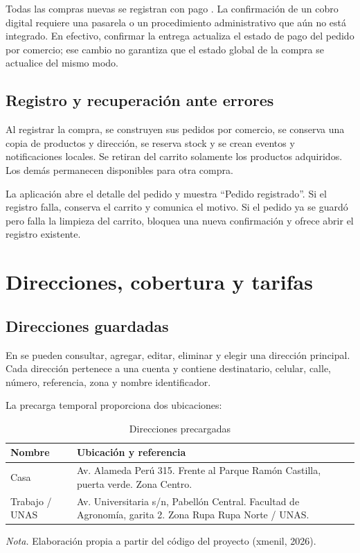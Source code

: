 \documentclass[12pt,letterpaper]{article}
\newcommand{\codigo}[1]{\texttt{\detokenize{#1}}}
\begin{document}
Todas las compras nuevas se registran con pago \codigo{pendiente}. La confirmación de un cobro digital requiere una pasarela o un procedimiento administrativo que aún no está integrado. En efectivo, confirmar la entrega actualiza el estado de pago del pedido por comercio; ese cambio no garantiza que el estado global de la compra se actualice del mismo modo.

\subsection{Registro y recuperación ante errores}

Al registrar la compra, se construyen sus pedidos por comercio, se conserva una copia de productos y dirección, se reserva stock y se crean eventos y notificaciones locales. Se retiran del carrito solamente los productos adquiridos. Los demás permanecen disponibles para otra compra.

La aplicación abre el detalle del pedido y muestra ``Pedido registrado''. Si el registro falla, conserva el carrito y comunica el motivo. Si el pedido ya se guardó pero falla la limpieza del carrito, bloquea una nueva confirmación y ofrece abrir el registro existente.

\section{Direcciones, cobertura y tarifas}

\subsection{Direcciones guardadas}

En  se pueden consultar, agregar, editar, eliminar y elegir una dirección principal. Cada dirección pertenece a una cuenta y contiene destinatario, celular, calle, número, referencia, zona y nombre identificador.

La precarga temporal proporciona dos ubicaciones:

\begin{table}[htbp]
\caption{Direcciones precargadas}
\begin{singlespace}
\begin{tabularx}{\textwidth}{L{3cm}X}
\toprule
Nombre & Ubicación y referencia \\
\midrule
Casa & Av. Alameda Perú 315. Frente al Parque Ramón Castilla, puerta verde. Zona Centro. \\
Trabajo / UNAS & Av. Universitaria s/n, Pabellón Central. Facultad de Agronomía, garita 2. Zona Rupa Rupa Norte / UNAS. \\
\bottomrule
\end{tabularx}
\end{singlespace}
\noindent\textit{Nota.} Elaboración propia a partir del código del proyecto (xmenil, 2026).
\end{table}
\end{document}
